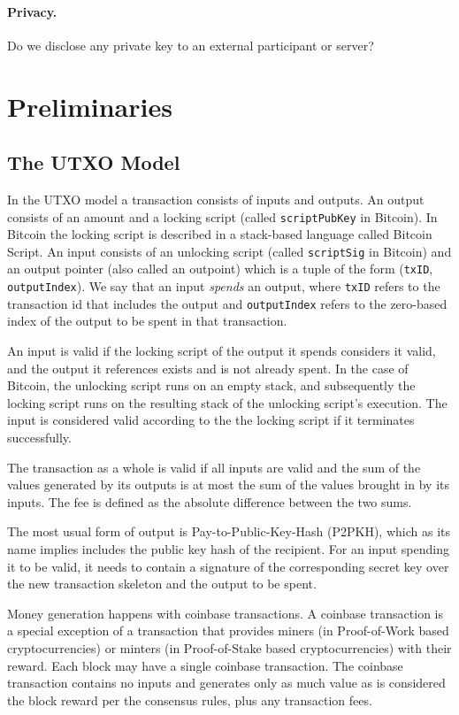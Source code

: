 \documentclass[sigconf]{acmart}
\begin{document}
\paragraph{Privacy.} Do we disclose any private key to an external participant or server?

\section{Preliminaries}
\subsection{The UTXO Model}
In the UTXO model a transaction consists of inputs and outputs. An output consists of an amount and a locking script (called \texttt{scriptPubKey} in Bitcoin). In Bitcoin the locking script is described in a stack-based language called Bitcoin Script. An input consists of an unlocking script (called \texttt{scriptSig} in Bitcoin) and an output pointer (also called an outpoint) which is a tuple of the form (\texttt{txID}, \texttt{outputIndex}). We say that an input \emph{spends} an output, where \texttt{txID} refers to the transaction id that includes the output and \texttt{outputIndex} refers to the zero-based index of the output to be spent in that transaction.

An input is valid if the locking script of the output it spends considers it valid, and the output it references exists and is not already spent. In the case of Bitcoin, the unlocking script runs on an empty stack, and subsequently the locking script runs on the resulting stack of the unlocking script's execution. The input is considered valid according to the the locking script if it terminates successfully.

The transaction as a whole is valid if all inputs are valid and the sum of the values generated by its outputs is at most the sum of the values brought in by its inputs. The fee is defined as the absolute difference between the two sums.

The most usual form of output is Pay-to-Public-Key-Hash (P2PKH), which as its name implies includes the public key hash of the recipient. For an input spending it to be valid, it needs to contain a signature of the corresponding secret key over the new transaction skeleton and the output to be spent.

Money generation happens with coinbase transactions. A coinbase transaction is a special exception of a transaction that provides miners (in Proof-of-Work based cryptocurrencies) or minters (in Proof-of-Stake based cryptocurrencies) with their reward. Each block may have a single coinbase transaction. The coinbase transaction contains no inputs and generates only as much value as is considered the block reward per the consensus rules, plus any transaction fees.
\end{document}
